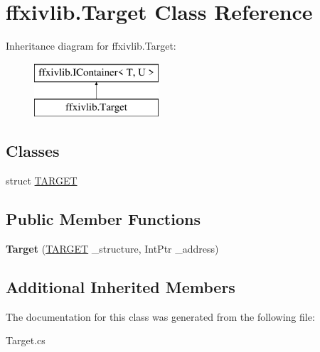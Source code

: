 \hypertarget{classffxivlib_1_1_target}{\section{ffxivlib.\-Target Class Reference}
\label{classffxivlib_1_1_target}
}
Inheritance diagram for ffxivlib.\-Target\-:\begin{figure}[H]
\begin{center}
\leavevmode
\includegraphics[height=2.000000cm]{classffxivlib_1_1_target}
\end{center}
\end{figure}
\subsection*{Classes}
\begin{DoxyCompactItemize}
\item 
struct \hyperlink{structffxivlib_1_1_target_1_1_t_a_r_g_e_t}{T\-A\-R\-G\-E\-T}
\end{DoxyCompactItemize}
\subsection*{Public Member Functions}
\begin{DoxyCompactItemize}
\item 
\hypertarget{classffxivlib_1_1_target_a9899e42d32c9727a99163ebfa963fafe}{{\bfseries Target} (\hyperlink{structffxivlib_1_1_target_1_1_t_a_r_g_e_t}{T\-A\-R\-G\-E\-T} \-\_\-structure, Int\-Ptr \-\_\-address)}\label{classffxivlib_1_1_target_a9899e42d32c9727a99163ebfa963fafe}

\end{DoxyCompactItemize}
\subsection*{Additional Inherited Members}


The documentation for this class was generated from the following file\-:\begin{DoxyCompactItemize}
\item 
Target.\-cs\end{DoxyCompactItemize}
